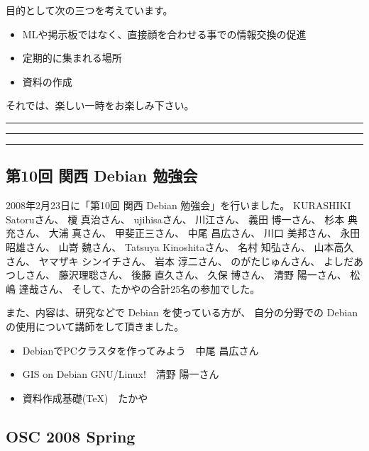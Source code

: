\documentclass[mingoth,a4paper]{jsarticle}
\begin{document}
 目的として次の三つを考えています。
 \begin{itemize}
  \item MLや掲示板ではなく、直接顔を合わせる事での情報交換の促進
  \item 定期的に集まれる場所
  \item 資料の作成
 \end{itemize}

 それでは、楽しい一時をお楽しみ下さい。

\newpage

\begin{minipage}[b]{0.2\hsize}
 {}
\end{minipage}
\begin{minipage}[b]{0.8\hsize}
\hrule
\vspace{2mm}
\hrule
\setcounter{tocdepth}{1}
\tableofcontents
\vspace{2mm}
\hrule
\end{minipage}

\subsection{第10回 関西 Debian 勉強会}
2008年2月23日に「第10回 関西 Debian 勉強会」を行いました。
KURASHIKI Satoruさん、
榎 真治さん、
ujihisaさん、
川江さん、
義田 博一さん、
杉本 典充さん、
大浦 真さん、
甲斐正三さん、
中尾 昌広さん、
川口 美邦さん、
永田昭雄さん、
山嵜 魏さん、
Tatsuya Kinoshitaさん、
名村 知弘さん、
山本高久さん、
ヤマザキ シンイチさん、
岩本 淳二さん、
のがたじゅんさん、
よしだあつしさん、
藤沢理聡さん、
後藤 直久さん、
久保 博さん、
清野 陽一さん、
松嶋 達哉さん、
そして、たかやの合計25名の参加でした。

また、内容は、研究などで Debian を使っている方が、
自分の分野での Debian の使用について講師をして頂きました。

\begin{itemize}
 \item DebianでPCクラスタを作ってみよう　中尾 昌広さん
 \item GIS on Debian GNU/Linux!　清野 陽一さん
 \item 資料作成基礎(TeX)　たかや
\end{itemize}

\subsection{OSC 2008 Spring}
\end{document}
